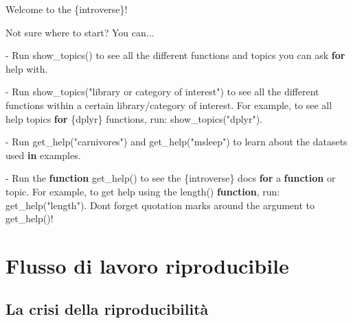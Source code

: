 \documentclass[
  11pt,
]{krantz}
\makeatletter
\newenvironment{Shaded}{\begin{snugshade}}{\end{snugshade}}
\newcommand{\AttributeTok}[1]{\textcolor[rgb]{0.61,0.61,0.61}{#1}}
\newcommand{\ControlFlowTok}[1]{\textcolor[rgb]{0.27,0.27,0.27}{\textbf{#1}}}
\newcommand{\FunctionTok}[1]{\textcolor[rgb]{0,0,0}{#1}}
\newcommand{\NormalTok}[1]{#1}
\newcommand{\SpecialCharTok}[1]{\textcolor[rgb]{0,0,0}{#1}}
\newcommand{\StringTok}[1]{\textcolor[rgb]{0.5,0.5,0.5}{#1}}
\newenvironment{kframe}{%
\medskip{}
\setlength{\fboxsep}{.8em}
 \def\at@end@of@kframe{}%
 \ifinner\ifhmode%
  \def\at@end@of@kframe{\end{minipage}}%
  \begin{minipage}{\columnwidth}%
 \fi\fi%
 \def\FrameCommand##1{\hskip\@totalleftmargin \hskip-\fboxsep
 \colorbox{shadecolor}{##1}\hskip-\fboxsep
     \hskip-\linewidth \hskip-\@totalleftmargin \hskip\columnwidth}%
 \MakeFramed {\advance\hsize-\width
   \@totalleftmargin\z@ \linewidth\hsize
   \@setminipage}}%
 {\par\unskip\endMakeFramed%
 \at@end@of@kframe}
\renewenvironment{Shaded}{\begin{kframe}}{\end{kframe}}
\theoremstyle{definition}
\theoremstyle{definition}
\theoremstyle{definition}
\theoremstyle{definition}
\theoremstyle{remark}
\makeatother
\begin{document}
\begin{Shaded}
\begin{Highlighting}[]
\NormalTok{Welcome to the \{introverse\}}\SpecialCharTok{!}

\NormalTok{Not sure where to start? You can...}

\SpecialCharTok{{-}}\NormalTok{ Run }\FunctionTok{show\_topics}\NormalTok{() to see all the different functions }
\NormalTok{  and topics you can ask }\ControlFlowTok{for}\NormalTok{ help with.}
  
\SpecialCharTok{{-}}\NormalTok{ Run }\FunctionTok{show\_topics}\NormalTok{(}\StringTok{"library or category of interest"}\NormalTok{) to see }
\NormalTok{  all the different functions within a certain library}\SpecialCharTok{/}\NormalTok{category }
\NormalTok{  of interest. For example, to see all help topics }\ControlFlowTok{for}\NormalTok{ \{dplyr\}}
\NormalTok{  functions, run}\SpecialCharTok{:} \FunctionTok{show\_topics}\NormalTok{(}\StringTok{"dplyr"}\NormalTok{).}

\SpecialCharTok{{-}}\NormalTok{ Run }\FunctionTok{get\_help}\NormalTok{(}\StringTok{"carnivores"}\NormalTok{) and }\FunctionTok{get\_help}\NormalTok{(}\StringTok{"msleep"}\NormalTok{) to learn }
\NormalTok{  about the datasets used }\ControlFlowTok{in}\NormalTok{ examples.}
    
\SpecialCharTok{{-}}\NormalTok{ Run the }\ControlFlowTok{function} \FunctionTok{get\_help}\NormalTok{() to see the \{introverse\} docs}
  \ControlFlowTok{for}\NormalTok{ a }\ControlFlowTok{function}\NormalTok{ or topic. For example, to get help using }
\NormalTok{  the }\StringTok{\textasciigrave{}}\AttributeTok{length()}\StringTok{\textasciigrave{}} \ControlFlowTok{function}\NormalTok{, run}\SpecialCharTok{:} \FunctionTok{get\_help}\NormalTok{(}\StringTok{"length"}\NormalTok{).}
\NormalTok{  Don}\StringTok{\textquotesingle{}t forget quotation marks around the argument to get\_help()!}
\end{Highlighting}
\end{Shaded}

\hypertarget{flusso-di-lavoro-riproducibile}{%
\section{Flusso di lavoro riproducibile}\label{flusso-di-lavoro-riproducibile}}

\hypertarget{la-crisi-della-riproducibilituxe0}{%
\subsection{La crisi della riproducibilità}\label{la-crisi-della-riproducibilituxe0}}
\end{document}
